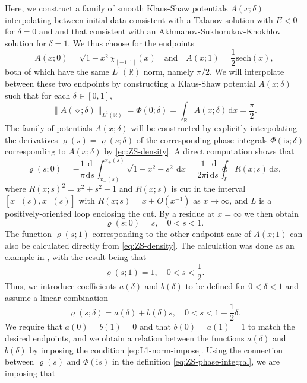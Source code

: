 \documentclass[12pt]{amsart}
\numberwithin{equation}{section}
\newcommand{\dd}{\mathrm{d}}
\newcommand{\ii}{\mathrm{i}}
\newcommand{\phaseint}{\Phi}
\newcommand{\evdensity}{\varrho}
\begin{document}
Here, we construct a family of smooth Klaus-Shaw potentials $A(x;\delta)$ interpolating between initial data consistent with a Talanov solution with $E<0$ for $\delta=0$ and and that consistent with an Akhmanov-Sukhorukov-Khokhlov solution for $\delta=1$.  We thus choose for the endpoints
\begin{equation}
A(x;0)=\sqrt{1-x^2}\chi_{[-1,1]}(x)\quad\text{and}\quad A(x;1)=\frac{1}{2}\mathrm{sech}(x),
\end{equation}
both of which have the same $L^1(\mathbb{R})$ norm, namely $\pi/2$.  We will interpolate between these two endpoints by constructing a Klaus-Shaw potential $A(x;\delta)$ such that for each $\delta\in [0,1]$,
\begin{equation}
\|A(\diamond;\delta)\|_{L^1(\mathbb{R})}=\phaseint(0;\delta)=\int_\mathbb{R}A(x;\delta)\,\dd x =\frac{\pi}{2}.
\label{eq:L1-norm-impose}
\end{equation}
The family of potentials $A(x;\delta)$ will be constructed by explicitly interpolating the derivatives $\evdensity(s)=\evdensity(s;\delta)$ of the corresponding phase integrals $\phaseint(\ii s;\delta)$ corresponding to $A(x;\delta)$ by \eqref{eq:ZS-density}.  A direct computation shows that
\begin{equation}
\evdensity(s;0)=-\frac{1}{\pi}\frac{\dd}{\dd s}\int_{x_-(s)}^{x_+(s)}\sqrt{1-x^2-s^2}\,\dd x =\frac{1}{2\pi\ii}\frac{\dd}{\dd s}\oint_LR(x;s)\,\dd x,
\end{equation}
where $R(x;s)^2=x^2+s^2-1$ and $R(x;s)$ is cut in the interval $[x_-(s),x_+(s)]$ with $R(x;s)=x+O(x^{-1})$ as $x\to\infty$, and $L$ is a positively-oriented loop enclosing the cut.  By a residue at $x=\infty$ we then obtain
\begin{equation}
\evdensity(s;0)=s,\quad 0<s<1.
\end{equation}
The function $\evdensity(s;1)$ corresponding to the other endpoint case of $A(x;1)$ can also be calculated directly from \eqref{eq:ZS-density}.  The calculation was done as an example in \cite{Kamvissis:2003}, with the result being that 
\begin{equation}
\evdensity(s;1)=1,\quad 0<s<\frac{1}{2}.
\end{equation}
Thus, we introduce coefficients $a(\delta)$ and $b(\delta)$ to be defined for $0<\delta<1$ and assume a linear combination
\begin{equation}
\evdensity(s;\delta)=a(\delta)+b(\delta)s,\quad 0<s<1-\frac{1}{2}\delta.
\end{equation}
We require that $a(0)=b(1)=0$ and that $b(0)=a(1)=1$ to match the desired endpoints, and we obtain a relation between the functions $a(\delta)$ and $b(\delta)$ by imposing the condition \eqref{eq:L1-norm-impose}.  Using the connection between $\evdensity(s)$ and $\phaseint(\ii s)$ in the definition \eqref{eq:ZS-phase-integral}, we are imposing that
\end{document}
